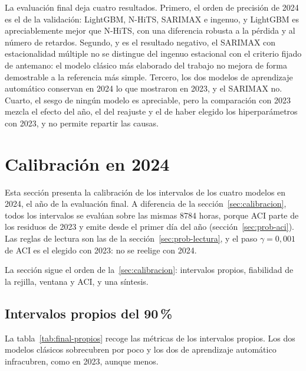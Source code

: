 La evaluación final deja cuatro resultados. Primero, el orden de precisión de
2024 es el de la validación: LightGBM, N-HiTS, SARIMAX e ingenuo, y LightGBM es
apreciablemente mejor que N-HiTS, con una diferencia robusta a la pérdida y al
número de retardos. Segundo, y es el resultado negativo, el SARIMAX con
estacionalidad múltiple no se distingue del ingenuo estacional con el criterio
fijado de antemano: el modelo clásico más elaborado del trabajo no mejora de
forma demostrable a la referencia más simple. Tercero, los dos modelos de
aprendizaje automático conservan en 2024 lo que mostraron en 2023, y el
SARIMAX no. Cuarto, el sesgo de ningún modelo es apreciable, pero la comparación
con 2023 mezcla el efecto del año, el del reajuste y el de haber elegido los
hiperparámetros con 2023, y no permite repartir las causas.

\section{Calibración en 2024}\label{sec:calibracion-final}

Esta sección presenta la calibración de los intervalos de los cuatro modelos en
2024, el año de la evaluación final. A diferencia de la
sección~\ref{sec:calibracion}, todos los intervalos se evalúan sobre las mismas
8784 horas, porque ACI parte de los residuos de 2023 y emite desde el primer día
del año (sección~\ref{sec:prob-aci}). Las reglas de lectura son las de la
sección~\ref{sec:prob-lectura}, y el paso $\gamma = 0{,}001$ de ACI es el
elegido con 2023: no se reelige con 2024.

La sección sigue el orden de la~\ref{sec:calibracion}: intervalos propios,
fiabilidad de la rejilla, ventana y ACI, y una síntesis.

\subsection{Intervalos propios del 90\,\%}\label{sec:final-propios}

La tabla~\ref{tab:final-propios} recoge las métricas de los intervalos propios.
Los dos modelos clásicos sobrecubren por poco y los dos de aprendizaje automático
infracubren, como en 2023, aunque menos.

